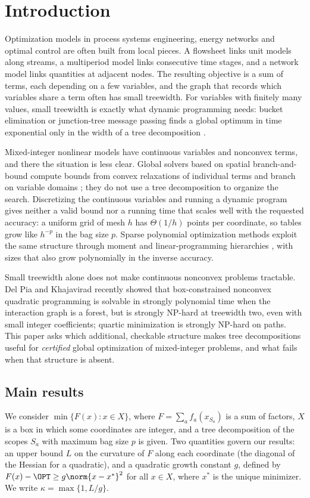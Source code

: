 \section{Introduction}\label{sec:intro}

Optimization models in process systems engineering, energy networks and
optimal control are often built from local pieces. A flowsheet links unit
models along streams, a multiperiod model links consecutive time stages,
and a network model links quantities at adjacent nodes. The resulting
objective is a sum of terms, each depending on a few variables, and the
graph that records which variables share a term often has small treewidth.
For variables with finitely many values, small treewidth is exactly what
dynamic programming needs: bucket elimination or junction-tree message
passing finds a global optimum in time exponential only in the width of a
tree decomposition \cite{Bertele1972,Dechter1999,KollerFriedman2009}.

Mixed-integer nonlinear models have continuous variables and nonconvex
terms, and there the situation is less clear. Global solvers based on
spatial branch-and-bound compute bounds from convex relaxations of
individual terms and branch on variable domains
\cite{TawarmalaniSahinidis2005,Belotti2009,Misener2014}; they do not use a
tree decomposition to organize the search. Discretizing the continuous
variables and running a dynamic program gives neither a valid bound nor a
running time that scales well with the requested accuracy: a uniform grid
of mesh $h$ has $\Theta(1/h)$ points per coordinate, so tables grow like
$h^{-p}$ in the bag size $p$. Sparse polynomial optimization methods
exploit the same structure through moment and linear-programming
hierarchies \cite{Waki2006,Lasserre2006,BienstockMunoz2018}, with sizes
that also grow polynomially in the inverse accuracy.

Small treewidth alone does not make continuous nonconvex problems
tractable. Del Pia and Khajavirad \cite{DelPiaKhajavirad2026} recently
showed that box-constrained nonconvex quadratic programming is solvable in
strongly polynomial time when the interaction graph is a forest, but is
strongly NP-hard at treewidth two, even with small integer coefficients;
quartic minimization is strongly NP-hard on paths. This paper asks which
additional, checkable structure makes tree decompositions useful for
\emph{certified} global optimization of mixed-integer problems, and what
fails when that structure is absent.

\subsection{Main results}
We consider $\min\{F(x):x\in X\}$, where $F=\sum_af_a(x_{S_a})$ is a sum of
factors, $X$ is a box in which some coordinates are integer, and a tree
decomposition of the scopes $S_a$ with maximum bag size $p$ is given. Two
quantities govern our results: an upper bound $L$ on the curvature of $F$
along each coordinate (the diagonal of the Hessian for a quadratic), and a
quadratic growth constant $g$, defined by
$F(x)-\OPT\ge g\norm{x-x^*}^2$ for all $x\in X$, where $x^*$ is the unique
minimizer. We write $\kappa=\max\{1,L/g\}$.

